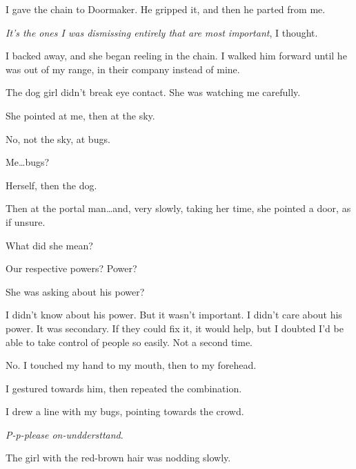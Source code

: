 I gave the chain to Doormaker.  He gripped it, and then he parted from me.



\emph{It's the ones I was dismissing entirely that are most important}, I thought.



I backed away, and she began reeling in the chain.  I walked him forward until he was out of my range, in their company instead of mine.



The dog girl didn't break eye contact.  She was watching me carefully.



She pointed at me, then at the sky.



No, not the sky, at bugs.



Me\ldots bugs?



Herself, then the dog.



Then at the portal man\ldots and, very slowly, taking her time, she pointed a door, as if unsure.



What did she mean?



Our respective powers?  Power?



She was asking about his power?



I didn't know about his power.  But it wasn't important.  I didn't care about his power.  It was secondary.  If they could fix it, it would help, but I doubted I'd be able to take control of people so easily.  Not a second time.



No.  I touched my hand to my mouth, then to my forehead.



I gestured towards him, then repeated the combination.



I drew a line with my bugs, pointing towards the crowd.



\emph{P-p-please on-unddersttand}.



The girl with the red-brown hair was nodding slowly.



